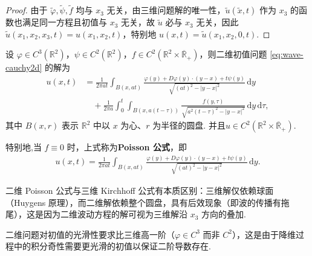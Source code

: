 \documentclass[../../main.tex]{subfiles}%
\begin{document}
\begin{proof}
由于 $\tilde{\varphi},\tilde{\psi},\tilde{f}$ 均与 $x_3$ 无关，由三维问题解的唯一性，$\tilde{u}(\tilde{x},t)$ 作为 $x_3$ 的函数也满足同一方程且初值与 $x_3$ 无关，故 $\tilde{u}$ 必与 $x_3$ 无关，因此 $\tilde{u}(x_1,x_2,x_3,t)=u(x_1,x_2,t)$，特别地 $u(x,t)=\tilde{u}(x_1,x_2,0,t)$.
\end{proof}

\begin{theorem}[Poisson 公式]
设 $\varphi\in C^3(\mathbb{R}^2)$，$\psi\in C^2(\mathbb{R}^2)$，$f\in C^2(\mathbb{R}^2\times\overline{\mathbb{R}}_+)$，则二维初值问题 \eqref{eq:wave-cauchy2d} 的解为
\begin{align}
u(x,t)&=\frac{1}{2\pi at}\int_{B(x,at)}\frac{\varphi(y)+D\varphi(y)\cdot(y-x)+t\psi(y)}{\sqrt{(at)^2-|y-x|^2}}\,\mathrm{d}y \nonumber \\
&\quad+\frac{1}{2\pi a}\int_0^t\int_{B(x,a(t-\tau))}\frac{f(y,\tau)}{\sqrt{a^2(t-\tau)^2-|y-x|^2}}\,\mathrm{d}y\,\mathrm{d}\tau, \label{eq:poisson2d}
\end{align}
其中 $B(x,r)$ 表示 $\mathbb{R}^2$ 中以 $x$ 为心、$r$ 为半径的圆盘. 并且$u\in C^2(\mathbb{R}^2\times\overline{\mathbb{R}}_+)$.

特别地,当 $f\equiv 0$ 时，上式称为\textbf{Poisson 公式}，即
\begin{align}
u(x,t)=\frac{1}{2\pi at}\int_{B(x,at)}\frac{\varphi(y)+D\varphi(y)\cdot(y-x)+t\psi(y)}{\sqrt{(at)^2-|y-x|^2}}\,\mathrm{d}y. \label{eq:poisson2d-hom}
\end{align}
\end{theorem}
\begin{remark}
二维 Poisson 公式与三维 Kirchhoff 公式有本质区别：三维解仅依赖球面（Huygens 原理），而二维解依赖整个圆盘，具有后效现象（即波的传播有拖尾），这是因为二维波动方程的解可视为三维解沿 $x_3$ 方向的叠加.
\end{remark}
\begin{remark}
二维问题对初值的光滑性要求比三维高一阶（$\varphi\in C^3$ 而非 $C^2$），这是由于降维过程中的积分奇性需要更光滑的初值以保证二阶导数存在.
\end{remark}
\end{document}
